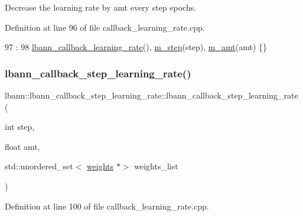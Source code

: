 Decrease the learning rate by amt every step epochs. 

Definition at line 96 of file callback\+\_\+learning\+\_\+rate.\+cpp.


\begin{DoxyCode}
97                        :
98   \hyperlink{classlbann_1_1lbann__callback__learning__rate_a69687cd55f4d09c480e08e18488519fe}{lbann\_callback\_learning\_rate}(), \hyperlink{classlbann_1_1lbann__callback__step__learning__rate_a804bffdc6bcc1e1f43dc068db852b993}{m\_step}(step), 
      \hyperlink{classlbann_1_1lbann__callback__step__learning__rate_ab6f5430cf862ec67392dc0f69ced81e6}{m\_amt}(amt) \{\}
\end{DoxyCode}
\mbox{\label{classlbann_1_1lbann__callback__step__learning__rate_a22ece9107d7aa79c6b849b251db036b0}} 
\subsubsection{\texorpdfstring{lbann\+\_\+callback\+\_\+step\+\_\+learning\+\_\+rate()}{lbann\_callback\_step\_learning\_rate()}\hspace{0.1cm}{\footnotesize\ttfamily [2/3]}}
{\footnotesize\ttfamily lbann\+::lbann\+\_\+callback\+\_\+step\+\_\+learning\+\_\+rate\+::lbann\+\_\+callback\+\_\+step\+\_\+learning\+\_\+rate (\begin{DoxyParamCaption}\item[{int}]{step,  }\item[{float}]{amt,  }\item[{std\+::unordered\+\_\+set$<$ \hyperlink{classlbann_1_1weights}{weights} $\ast$$>$}]{weights\+\_\+list }\end{DoxyParamCaption})}



Definition at line 100 of file callback\+\_\+learning\+\_\+rate.\+cpp.


